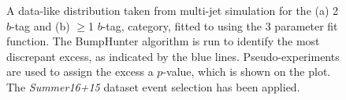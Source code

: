 \begin{figure}[!ht]
  \begin{center}
   \captionsetup[subfigure]{aboveskip=0pt,justification=centering}
  \end{center}
  \caption{A data-like distribution taken from multi-jet simulation for the (a) 2 $b$-tag and (b) $\geq$1 $b$-tag,
    category, fitted to using the 3 parameter fit function.
    The BumpHunter algorithm is run to identify the most discrepant excess, as indicated by the blue lines.
    Pseudo-experiments are used to assign the excess a $p$-value, which is shown on the plot.
    The \textit{Summer16+15} dataset event selection has been applied.}
  \label{fig:DataLikeSearchPhase}
\end{figure}

